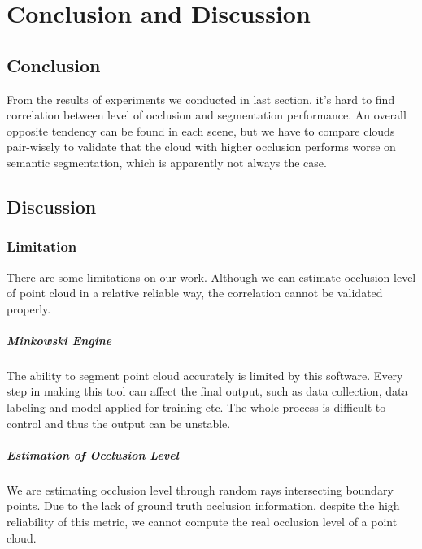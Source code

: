 \documentclass[11pt, a4paper,oneside,chapterprefix=false]{scrbook}
\begin{document}
\chapter{Conclusion and Discussion} \label{chp:conclusion}

\section{Conclusion}

From the results of experiments we conducted in last section, it's hard to find correlation between level of occlusion and segmentation performance. An overall opposite tendency can be found in each scene, but we have to compare clouds pair-wisely to validate that the cloud with higher occlusion performs worse on semantic segmentation, which is apparently not always the case.

\section{Discussion}

\subsection{Limitation}

There are some limitations on our work. Although we can estimate occlusion level of point cloud in a relative reliable way, the correlation cannot be validated properly. 

\paragraph{Minkowski Engine}

The ability to segment point cloud accurately is limited by this software. Every step in making this tool can affect the final output, such as data collection, data labeling and model applied for training etc. The whole process is difficult to control and thus the output can be unstable. 

\paragraph{Estimation of Occlusion Level}

We are estimating occlusion level through random rays intersecting boundary points. Due to the lack of ground truth occlusion information, despite the high reliability of this metric, we cannot compute the real occlusion level of a point cloud.
\end{document}
